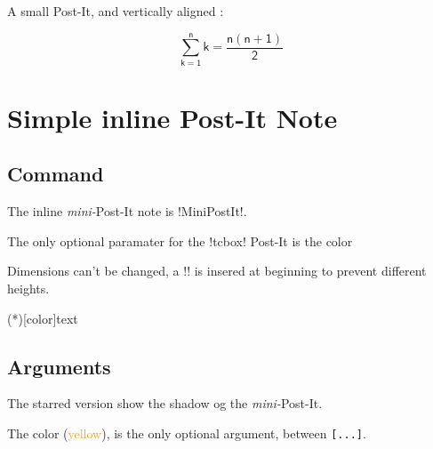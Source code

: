 \documentclass[english,a4paper,11pt]{article}
\newcommand\Cle[1]{{\small\sffamily\textlangle \textcolor{orange}{#1}\textrangle}}
\begin{document}
\begin{DemoCode}[]
\begin{wrapstuff}[r,top=1]
\begin{PostItNote}[Rotate=5,Render=tikzv2,Pin=Scotch,Color=pink]
\lipsum[1][1-2]
\end{PostItNote}
\end{wrapstuff}

\lipsum[1]
\end{DemoCode}

\begin{DemoCode}[]
A small Post-It, and vertically aligned :
%
\hfill\begin{PostItNote}[Rotate=-10,Color=orange,Width=5cm,Height=5cm, AlignV=center,Corner,PinColor=yellow, PinShift=-1,AlignPostIt=center]

\textsf{\small\lipsum[1][1-2]}
\[\mathsf{\displaystyle\sum_{k=1}^{n} k = \dfrac{n(n+1)}{2}}\]
\end{PostItNote}
\end{DemoCode}

\pagebreak

\section{Simple inline Post-It Note}

\subsection{Command}

\begin{cautionblock}
The inline \textit{mini-}Post-It note is \motcletex!MiniPostIt!.

The only optional paramater for the \motcletex!tcbox! Post-It is the color

\smallskip

Dimensions can't be changed, a \motcletex!\vphantom! is insered at beginning to prevent different heights.
\end{cautionblock}

\begin{DemoCode}
\MiniPostIt(*)[color]{text}
\end{DemoCode}

\subsection{Arguments}

\begin{noteblock}
The starred version show the shadow og the \textit{mini-}Post-It.

The color (\Cle{yellow}), is the only optional argument, between \texttt{[...]}.
\end{noteblock}
\end{document}
